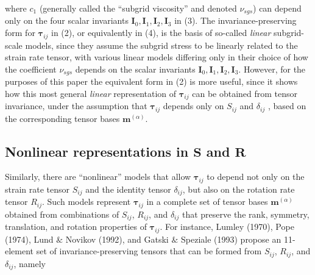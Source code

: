 where  $c_1$ (generally called the ``subgrid viscosity'' and denoted $\nu_{sgs}$) can depend only on the four scalar invariants $\mathbf{I}_{0}, \mathbf{I}_{1}, \mathbf{I}_{2}, \mathbf{I}_{3}$  in (3). The invariance-preserving form for $\mathbf{\tau}_{ij}$  in (2), or equivalently in (4), is the basis of so-called \textit{linear} subgrid-scale models, since they assume the subgrid stress to be linearly related to the strain rate tensor, with various linear models differing only in their choice of how the coefficient  $\nu_{sgs}$ depends on the scalar invariants $\mathbf{I}_{0}, \mathbf{I}_{1}, \mathbf{I}_{2}, \mathbf{I}_{3}$.  However, for the purposes of this paper the equivalent form in (2) is more useful, since it shows how this most general \textit{linear} representation of $\mathbf{\tau}_{ij}$  can be obtained from tensor invariance, under the assumption that $\mathbf{\tau}_{ij}$  depends only on $S_{ij}$  and $\delta_{ij}$ , based on the corresponding tensor bases $\mathbf{m}^{(\alpha)}$. 
 

\subsection{Nonlinear representations in $\mathbf{S}$ and $\mathbf{R}$} 

Similarly, there are ``nonlinear'' models that allow $\mathbf{\tau}_{ij}$  to depend not only on the strain rate tensor $S_{ij}$  and the identity tensor $\delta_{ij}$, but also on the rotation rate tensor $R_{ij}$. Such models represent  $\mathbf{\tau}_{ij}$  in a complete set of tensor bases  $\mathbf{m}^{(\alpha)}$ obtained from combinations of $S_{ij}$, $R_{ij}$, and $\delta_{ij}$  that preserve the rank, symmetry, translation, and rotation properties of $\mathbf{\tau}_{ij}$. For instance, Lumley (1970), Pope (1974), Lund $\&$ Novikov (1992), and Gatski $\&$ Speziale (1993) propose an 11-element set of invariance-preserving tensors   that can be formed from $S_{ij}$, $R_{ij}$, and $\delta_{ij}$, namely

